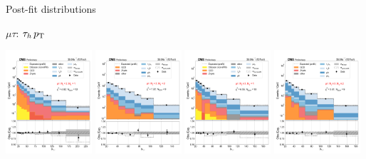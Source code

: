 \begin{frame}{Post-fit distributions}
\begin{tcolorbox}{$\mu\tau$: $\tau_{h}\,p_{\mathrm{T}}$}
\begin{center}
            \includegraphics[width=0.24\textwidth]{chapters/Analysis/sectionStatisticalAnalysis/figures/fit/mutau_cat_eq2_eq1}
            \includegraphics[width=0.24\textwidth]{chapters/Analysis/sectionStatisticalAnalysis/figures/fit/mutau_cat_eq2_eq2}
            \includegraphics[width=0.24\textwidth]{chapters/Analysis/sectionStatisticalAnalysis/figures/fit/mutau_cat_gt3_eq1}
            \includegraphics[width=0.24\textwidth]{chapters/Analysis/sectionStatisticalAnalysis/figures/fit/mutau_cat_gt3_gt2}
        \end{center}
    \end{tcolorbox}

\end{frame}

